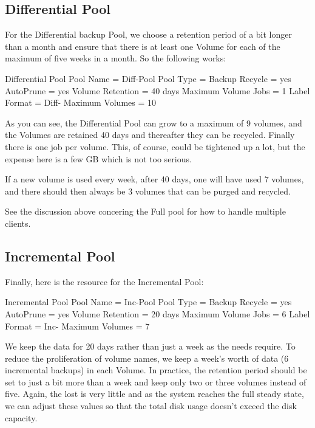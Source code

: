 \label{DiffPool}
\subsection{Differential Pool}

For the Differential backup Pool, we choose a retention period of a bit longer
than a month and ensure that there is at least one Volume for each of the
maximum of five weeks in a month. So the following works:

\begin{bconfig}{Differential Pool}
Pool {
  Name = Diff-Pool
  Pool Type = Backup
  Recycle = yes
  AutoPrune = yes
  Volume Retention = 40 days
  Maximum Volume Jobs = 1
  Label Format = Diff-
  Maximum Volumes = 10
}
\end{bconfig}

As you can see, the Differential Pool can grow to a maximum of 9 volumes,
and the Volumes are retained 40 days and thereafter they can be recycled. Finally
there is one job per volume. This, of course, could be tightened up a lot, but
the expense here is a few GB which is not too serious.

If a new volume is used every week, after 40 days, one will have used 7
volumes, and there should then always be 3 volumes that can be purged and
recycled.

See the discussion above concering the Full pool for how to handle multiple
clients.

\label{IncPool}
\subsection{Incremental Pool}

Finally, here is the resource for the Incremental Pool:

\begin{bconfig}{Incremental Pool}
Pool {
  Name = Inc-Pool
  Pool Type = Backup
  Recycle = yes
  AutoPrune = yes
  Volume Retention = 20 days
  Maximum Volume Jobs = 6
  Label Format = Inc-
  Maximum Volumes = 7
}
\end{bconfig}

We keep the data for 20 days rather than just a week as the needs require. To
reduce the proliferation of volume names, we keep a week's worth of data (6
incremental backups) in each Volume. In practice, the retention period should
be set to just a bit more than a week and keep only two or three volumes
instead of five. Again, the lost is very little and as the system reaches the
full steady state, we can adjust these values so that the total disk usage
doesn't exceed the disk capacity.

